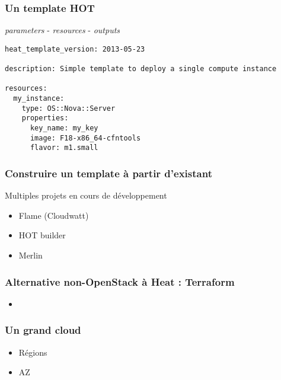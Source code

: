   \begin{frame}[containsverbatim]
    \frametitle{Un template HOT}
    \textit{parameters} - \textit{resources} - \textit{outputs}
\begin{verbatim}
heat_template_version: 2013-05-23

description: Simple template to deploy a single compute instance

resources:
  my_instance:
    type: OS::Nova::Server
    properties:
      key_name: my_key
      image: F18-x86_64-cfntools
      flavor: m1.small
\end{verbatim}
  \end{frame}

  \begin{frame}
    \frametitle{Construire un template à partir d'existant}
    Multiples projets en cours de développement
    \begin{itemize}
      \item Flame (Cloudwatt)
      \item HOT builder
      \item Merlin
    \end{itemize}
  \end{frame}

  \begin{frame}
    \frametitle{Alternative non-OpenStack à Heat : Terraform}
    \begin{itemize}
      \item 
    \end{itemize}
  \end{frame}

  \begin{frame}
    \frametitle{Un grand cloud}
    \begin{itemize}
      \item Régions
      \item AZ
    \end{itemize}
  \end{frame}
